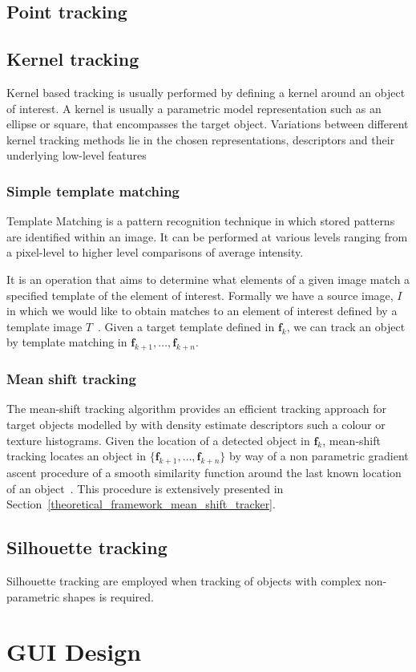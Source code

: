 
\subsection{Point tracking}\label{literature_review_point}

\subsection{Kernel tracking}
Kernel based tracking is usually performed by defining a kernel around an object
of interest. A kernel is usually a parametric model representation such as an
ellipse or square, that encompasses the target object. 
Variations between different kernel tracking methods lie in the chosen representations,
descriptors and their underlying low-level features~\cite{Prajapati2015}

\subsubsection{Simple template matching}
Template Matching is a pattern recognition technique in which stored patterns 
are identified within an image. It can be performed at various levels ranging
from a pixel-level to higher level comparisons of average intensity.

It is an operation that aims to determine what elements of a given image match a
specified template of the element of interest. Formally we have a source image,
$I$ in which we would like to obtain matches to an element of interest defined
by a template image $T$~\cite{Brunelli}. 
Given a target template defined in $\mathbf{f}_k$, we can track an object by 
template matching in $\mathbf{f}_{k+1},\ldots,\mathbf{f}_{k+n}$.

\subsubsection{Mean shift tracking}\label{literature_review_mean_shift}
The mean-shift tracking algorithm provides an efficient tracking approach for
target objects modelled by with density estimate descriptors such a colour or
texture histograms. 
Given the location of a detected object in $\mathbf{f}_k$, mean-shift tracking
locates an object in $\{\mathbf{f}_{k+1},\ldots,\mathbf{f}_{k+n}\}$ by way of a
non parametric gradient ascent procedure of a smooth similarity function around
the last known location of an object~\cite{Comaniciu2003}. This procedure is
extensively presented in Section~\ref{theoretical_framework_mean_shift_tracker}.

\subsection{Silhouette tracking}
Silhouette tracking are employed when tracking of objects with complex
non-parametric shapes is required.

\section{GUI Design}



